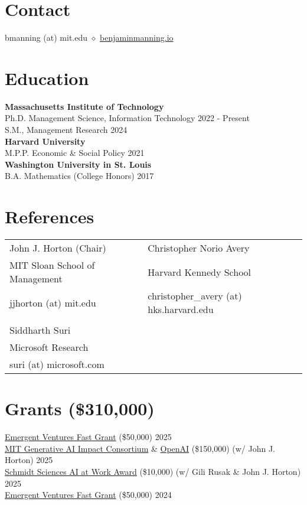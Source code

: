 \documentclass[margin,line,pifont,palatino,courier, 9pt]{res}
\begin{document}
\begin{resume}


\normalsize


\section{\sc Contact}
bmanning (at) mit.edu $\diamond$ \href{https://benjaminmanning.io/}{benjaminmanning.io}

\section{\sc Education}
{\bf Massachusetts Institute of Technology}\\
Ph.D. Management Science, Information Technology \hfill 2022 - Present\\
S.M., Management Research \hfill 2024\vspace{2mm}\\
{\bf Harvard University}\\
M.P.P. Economic \& Social Policy \hfill 2021\vspace{2mm}\\
{\bf Washington University in St. Louis}\\
B.A. Mathematics (College Honors) \hfill 2017

\section{\sc References}
\vspace{.15cm}
\begin{tabular}{@{}p{2.6in}p{2.75in}}
John J. Horton (Chair)& Christopher Norio Avery\\
MIT Sloan School of Management & Harvard Kennedy School \\
jjhorton (at) mit.edu & christopher\_avery (at) hks.harvard.edu\\\\
Siddharth Suri & \\
Microsoft Research & \\
suri (at) microsoft.com & \\
\end{tabular}

\section{\sc Grants (\$310,000)}
\href{https://www.mercatus.org/emergent-ventures}{Emergent Ventures Fast Grant} (\$50,000) \hfill 2025 \\
\href{https://computing.mit.edu/research/mit-generative-ai-impact-consortium/}{MIT Generative AI Impact Consortium} \& \href{https://openai.com/}{OpenAI} (\$150,000) (w/ John J. Horton) \hfill 2025 \\
\href{https://www.schmidtsciences.org/ai-at-work/}{Schmidt Sciences AI at Work Award} (\$10,000) (w/ Gili Rusak \& John J. Horton) \hfill 2025 \\
\href{https://www.mercatus.org/emergent-ventures}{Emergent Ventures Fast Grant} (\$50,000) \hfill 2024 


\end{resume}
\end{document}
